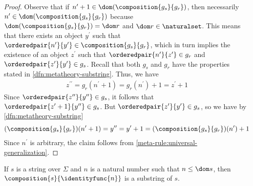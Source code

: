 \begin{proof}
    \vspace{0.3cm}
    \noindent
    Observe that if \( n^{\prime} + 1 \in \dom \mleft( \composition{g_{s}}{g_{r}} \mright) \), then necessarily
    \( n^{\prime} \in \dom \mleft( \composition{g_{s}}{g_{r}} \mright) \) because \( \dom \mleft( \composition{g_{s}}{g_{r}} \mright) = \dom r \)
    and \( \dom r \in \naturalset \).
    This means that there exists an object \( y^{\prime} \) such that \( \orderedpair{n^{\prime}}{y^{\prime}} \in \composition{g_{s}}{g_{r}} \),
    which in turn implies the existence of an object \( z^{\prime} \) such that \( \orderedpair{n^{\prime}}{z^{\prime}} \in g_{r} \)
    and \( \orderedpair{z^{\prime}}{y^{\prime}} \in g_{s} \).
    Recall that both \( g_{s} \) and \( g_{r} \) have the properties stated in \cref{dfn:metatheory-substring}.
    Thus, we have
    \begin{align*}
        z^{\prime\prime} = g_{r}(n^{\prime} + 1) = g_{r}(n^{\prime}) + 1 = z^{\prime} + 1
    \end{align*}
    Since \( \orderedpair{z^{\prime\prime}}{y^{\prime\prime}} \in g_{s} \), it follows that
    \( \orderedpair{z^{\prime} + 1}{y^{\prime\prime}} \in g_{s} \).
    But \( \orderedpair{z^{\prime}}{y^{\prime}} \in g_{s} \), so we have by \cref{dfn:metatheory-substring}
    \begin{equation*}
        \mleft( \composition{g_{s}}{g_{r}} \mright)(n^{\prime} + 1) = y^{\prime\prime} = y^{\prime} + 1 = \mleft( \composition{g_{s}}{g_{r}} \mright)(n^{\prime}) + 1
    \end{equation*}
    Since \( n^{\prime} \) is arbitrary, the claim follows from \cref{meta-rule:universal-generalization}.
\end{proof}

\begin{thm}
     \label{thm:metatheory-a-composition-between-a-string-and-the-identity-function-is-always-a-substring}
    If \( s \) is a string over \( \Sigma \) and \( n \) is a natural number such that \( n \leq \dom s \),
    then \( \composition{s}{ \identityfunc{n} } \) is a substring of \( s \).
\end{thm}

